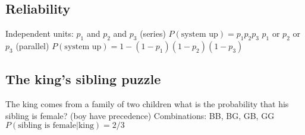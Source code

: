 \subsection{Reliability} 
\begin{outline}
\1 Independent units:
  \2 $p_1$ and $p_2$ and $p_3$ (series)
    \3$P(\text{system up}) = p_1 p_2 p_3$
  \2 $p_1$ or $p_2$ or $p_3$ (parallel)
    \3$P(\text{system up}) = 1 - (1-p_1)(1-p_2)(1-p_3)$
\end{outline}

\subsection{The king's sibling puzzle} 
\begin{outline}
\1 The king comes from a family of two children what is the probability that his sibling is female? (boy have precedence)
\1 Combinations: BB, BG, GB, GG
\1 $P(\text{sibling is female} | \text{king}) = 2/3$
\end{outline}




